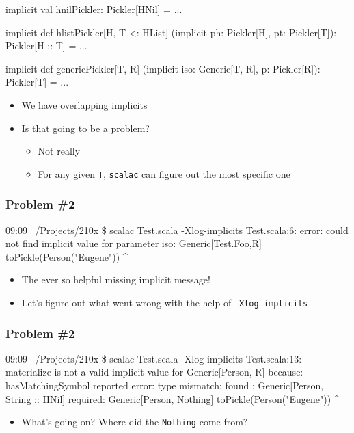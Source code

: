\documentclass[svgnames,hyperref={bookmarks=false}]{beamer}
\begin{document}
\begin{frame}[t, fragile]

\begin{semiverbatim}
implicit val hnilPickler: Pickler[HNil] = ...

implicit def hlistPickler[H, T <: HList]
  (implicit ph: Pickler[H],
            pt: Pickler[T]): Pickler[H :: T] = ...

implicit def genericPickler[T, R]
  (implicit iso: Generic[T, R],
            p: Pickler[R]): Pickler[T] = ...

\end{semiverbatim}

\begin{itemize}
\item We have overlapping implicits
\item Is that going to be a problem?
\pause
\begin{itemize}
\item Not really
\item For any given \texttt{T}, \texttt{scalac} can figure out the most specific one
\end{itemize}
\end{itemize}
\end{frame}

\begin{frame}[fragile]
\frametitle{Problem \#2}

\begin{semiverbatim}
09:09 ~/Projects/210x \$ scalac Test.scala -Xlog-implicits
Test.scala:6: error: could not find implicit value
for parameter iso: Generic[Test.Foo,R]
  toPickle(Person("Eugene"))
          ^
\end{semiverbatim}

\begin{itemize}
\item The ever so helpful missing implicit message!
\item Let's figure out what went wrong with the help of \texttt{-Xlog-implicits}
\end{itemize}
\end{frame}

\begin{frame}[fragile]
\frametitle{Problem \#2}

\begin{semiverbatim}
09:09 ~/Projects/210x \$ scalac Test.scala -Xlog-implicits
Test.scala:13: materialize is not a valid implicit value
for Generic[Person, R] because:
hasMatchingSymbol reported error: type mismatch;
 found   : Generic[Person, String :: HNil]
 required: Generic[Person, Nothing]
  toPickle(Person("Eugene"))
          ^
\end{semiverbatim}

\begin{itemize}
\item What's going on? Where did the \texttt{Nothing} come from?
\end{itemize}
\end{frame}
\end{document}
